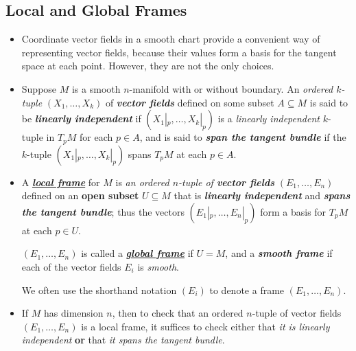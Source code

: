\documentclass[11pt]{article}
\begin{document}
\subsection{Local and Global Frames}
\begin{itemize}
\item Coordinate vector fields in a smooth chart provide a convenient way of representing vector fields, because their values form a basis for the tangent space at each point. However, they are not the only choices. 

\item \begin{definition}
Suppose $M$ is a smooth $n$-manifold with or without boundary. An \emph{ordered $k$-tuple} $(X_1, \ldots, X_k)$ of \emph{\textbf{vector fields}} defined on some subset $A \subseteq M$ is said to be \textit{\textbf{linearly independent}} if $(X_1|_{p}, \ldots, X_k|_{p})$ is a \emph{linearly independent} $k$-tuple in $T_{p}M$ for each $p \in A$, and is said to \emph{\textbf{span the tangent bundle}} if the $k$-tuple $(X_1|_{p},\ldots,X_k|_{p})$ spans $T_{p}M$ at each $p \in A$. 
\end{definition}

\item \begin{definition}
A \underline{\emph{\textbf{local frame}}} for $M$ is \emph{an ordered $n$-tuple of \textbf{vector fields}} $(E_1,\ldots,E_n)$ defined on an \textbf{open subset} $U \subseteq M$ that is \emph{\textbf{linearly independent}} and \emph{\textbf{spans the tangent bundle}}; thus the vectors $(E_1|_{p},\ldots,E_n|_{p})$ form a basis for $T_{p}M$ at each $p \in U$.

$(E_1,\ldots,E_n)$ is called a \underline{\emph{\textbf{global frame}}} if $U = M$, and a \emph{\textbf{smooth frame}} if each of the vector fields $E_i$ is \emph{smooth}.
\end{definition} We often use the shorthand notation $(E_i)$ to denote a frame $(E_1,\ldots,E_n)$. 

\item  If $M$ has dimension $n$, then to check that an ordered $n$-tuple of vector fields $(E_1,\ldots,E_n)$ is a local frame, it suffices to check either that \emph{it is linearly independent} \textbf{or} that \emph{it spans the tangent bundle}.


\end{itemize}
\end{document}
